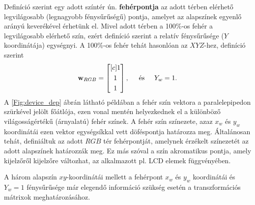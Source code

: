 Definíció szerint egy adott színtér ún. \textbf{fehérpontja} az adott térben elérhető legvilágosabb (legnagyobb fénysűrűségű) pontja, amelyet az alapszínek egyenlő arányú keverékével érhetünk el.
Mivel adott térben a 100\%-os fehér a legvilágosabb elérhető szín, ezért definíció szerint a relatív fénysűrűsége ($Y$ koordinátája) egységnyi.
A 100\%-os fehér tehát hasonlóan az $XYZ$-hez, definíció szerint 
\begin{equation}
\mathbf{w}_{RGB} = \begin{bmatrix}[c]
       1 \\[0.3em]
       1 \\[0.3em]
       1 \end{bmatrix}, \hspace{5mm} \text{és} \hspace{5mm} 
Y_w = 1.
\end{equation}
A \ref{Fig:device_dep} ábrán látható példában a fehér szín vektora a paralelepipedon szürkével jelölt főátlója, ezen vonal mentén helyezkednek el a különböző világosságértékű (árnyalatú) fehér színek.
A fehér szín színezete, azaz $x_w$ és $y_w$ koordinátái ezen vektor egységsíkkal vett döféspontja határozza meg.
Általánosan tehát, definiáltuk az adott $RGB$ tér fehérpontját, amelynek érzékelt színezetét az adott alapszínek határozzák meg.
Ez más szóval a szín akromatikus pontja, amely kijelzőről kijelzőre változhat, az alkalmazott pl. LCD elemek függvényében.

A három alapszín $xy$-koordinátái mellett a fehérpont $x_w$ és $y_w$ koordinátái és $Y_w = 1$ fénysűrűsége már elegendő információ szükség esetén a transzformációs mátrixok meghatározásához.

